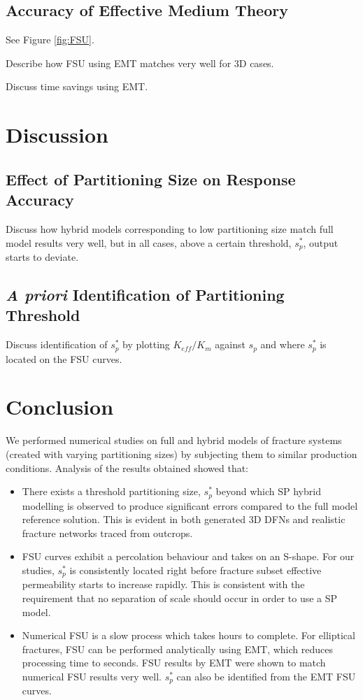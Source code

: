 \documentclass[a4paper]{article}
\begin{document}
\subsection{Accuracy of Effective Medium Theory}
See Figure \ref{fig:FSU}.

Describe how FSU using EMT matches very well for 3D cases.

Discuss time savings using EMT.

\section{Discussion}
\subsection{Effect of Partitioning Size on Response Accuracy}
Discuss how hybrid models corresponding to low partitioning size match full model results very well, but in all cases, above a certain threshold, $s_p^*$, output starts to deviate.

\subsection{\textit{A priori} Identification of Partitioning Threshold}
Discuss identification of $s_p^*$ by plotting $K_{eff}/K_m$ against $s_p$ and where $s_p^*$ is located on the FSU curves.

\section{Conclusion}
We performed numerical studies on full and hybrid models of fracture systems (created with varying partitioning sizes) by subjecting them to similar production conditions. Analysis of the results obtained showed that:

\begin{itemize}
    \item There exists a threshold partitioning size, $s_p^*$ beyond which SP hybrid modelling is observed to produce significant errors compared to the full model reference solution. This is evident in both generated 3D DFNs and realistic fracture networks traced from outcrops.
    
    \item FSU curves exhibit a percolation behaviour and takes on an S-shape. For our studies, $s_p^*$ is consistently located right before fracture subset effective permeability starts to increase rapidly. This is consistent with the requirement that no separation of scale should occur in order to use a SP model.
    
    \item Numerical FSU is a slow process which takes hours to complete. For elliptical fractures, FSU can be performed analytically using EMT, which reduces processing time to seconds. FSU results by EMT were shown to match numerical FSU results very well. $s_p^*$ can also be identified from the EMT FSU curves. 
    
\end{itemize}



\end{document}

